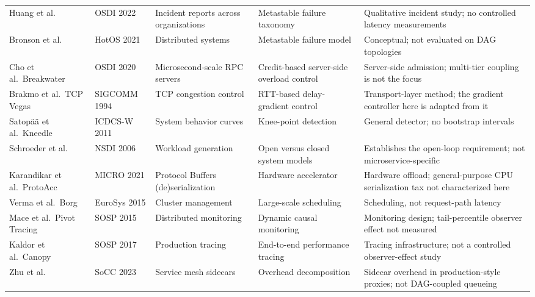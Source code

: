 \begin{table}[t]
{\begin{tabular}{@{}p{2.6cm}lp{3.2cm}p{3.3cm}p{5.2cm}@{}}
Huang et al.\ \cite{huang2022metastable} & OSDI 2022 & Incident reports across organizations & Metastable failure taxonomy & Qualitative incident study; no controlled latency measurements \\
Bronson et al.\ \cite{bronson2021metastable} & HotOS 2021 & Distributed systems & Metastable failure model & Conceptual; not evaluated on DAG topologies \\
Cho et al.\ Breakwater \cite{cho2020breakwater} & OSDI 2020 & Microsecond-scale RPC servers & Credit-based server-side overload control & Server-side admission; multi-tier coupling is not the focus \\
Brakmo et al.\ TCP Vegas \cite{brakmo1994vegas} & SIGCOMM 1994 & TCP congestion control & RTT-based delay-gradient control & Transport-layer method; the gradient controller here is adapted from it \\
Satop\"a\"a et al.\ Kneedle \cite{satopaa2011kneedle} & ICDCS-W 2011 & System behavior curves & Knee-point detection & General detector; no bootstrap intervals \\
Schroeder et al.\ \cite{schroeder2006open} & NSDI 2006 & Workload generation & Open versus closed system models & Establishes the open-loop requirement; not microservice-specific \\
Karandikar et al.\ ProtoAcc \cite{karandikar2021protoacc} & MICRO 2021 & Protocol Buffers (de)serialization & Hardware accelerator & Hardware offload; general-purpose CPU serialization tax not characterized here \\
Verma et al.\ Borg \cite{verma2015borg} & EuroSys 2015 & Cluster management & Large-scale scheduling & Scheduling, not request-path latency \\
Mace et al.\ Pivot Tracing \cite{mace2015pivot} & SOSP 2015 & Distributed monitoring & Dynamic causal monitoring & Monitoring design; tail-percentile observer effect not measured \\
Kaldor et al.\ Canopy \cite{kaldor2017canopy} & SOSP 2017 & Production tracing & End-to-end performance tracing & Tracing infrastructure; not a controlled observer-effect study \\
Zhu et al.\ \cite{zhu2023sidecar} & SoCC 2023 & Service mesh sidecars & Overhead decomposition & Sidecar overhead in production-style proxies; not DAG-coupled queueing \\
\bottomrule
\end{tabular}%
}
\end{table}
